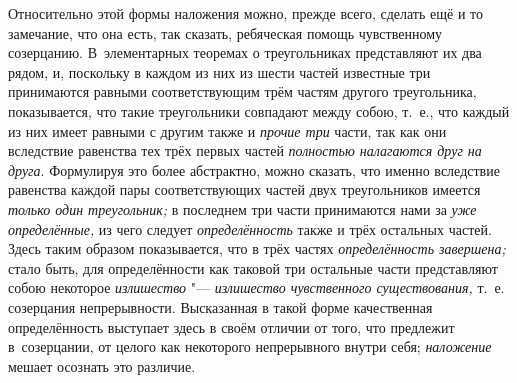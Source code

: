 Относительно этой формы наложения можно, прежде всего, сделать ещё и то
замечание, что она есть, так сказать, ребяческая помощь чувственному
созерцанию. В~элементарных теоремах о треугольниках представляют их два рядом,
и, поскольку в каждом из них из шести частей известные три принимаются равными
соответствующим трём частям другого треугольника, показывается, что такие
треугольники совпадают между собою, т.~е., что каждый из них имеет равными с
другим также и {\em прочие три} части, так как они вследствие равенства тех
трёх первых частей {\em полностью налагаются друг на друга}. Формулируя это
более абстрактно, можно сказать, что именно вследствие равенства каждой пары
соответствующих частей двух треугольников имеется {\em только один
треугольник;} в последнем три части принимаются нами за {\em уже определённые,}
из чего следует {\em определённость} также и трёх остальных частей. Здесь таким
образом показывается, что в трёх частях {\em определённость завершена;} стало
быть, для определённости как таковой три остальные части представляют собою
некоторое {\em излишество} "--- {\em излишество чувственного существования,}
т.~е. созерцания непрерывности. Высказанная в такой форме качественная
определённость выступает здесь в своём отличии от того, что предлежит
в~созерцании, от целого как некоторого непрерывного внутри себя;
{\em наложение} мешает осознать это различие.

